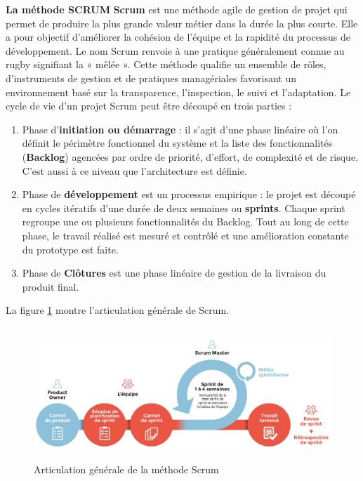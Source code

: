 \textbf{La méthode SCRUM}
\newline
\textbf{Scrum} est une méthode agile de gestion de projet qui permet de produire la plus grande valeur métier dans la durée la plus courte. Elle a pour objectif d’améliorer la cohésion de l’équipe et la rapidité du processus de développement. Le nom Scrum renvoie à une pratique généralement connue au rugby signifiant la « mêlée ». \newline
Cette méthode qualifie un ensemble de rôles, d’instruments de gestion et de pratiques managériales favorisant un environnement basé sur la transparence, l’inspection, le suivi et l’adaptation. Le cycle de vie d’un projet Scrum peut être découpé en trois parties :
\begin{enumerate}
	\item Phase d'\textbf{initiation ou démarrage} : il s’agit d’une phase linéaire où l’on définit le périmètre fonctionnel du système et la liste des fonctionnalités (\textbf{Backlog}) agencées par ordre de priorité, d’effort, de complexité et de risque. C’est aussi à ce niveau que l’architecture est définie.
	
	\item Phase de \textbf{développement} est un processus empirique : le projet est découpé en cycles itératifs d’une durée de deux semaines ou \textbf{sprints}. Chaque sprint regroupe une ou plusieurs fonctionnalités du Backlog. Tout au long de cette phase, le travail réalisé est mesuré et contrôlé et une amélioration constante du prototype est faite.
	
	\item Phase de \textbf{Clôtures} est une phase linéaire de gestion de la livraison du produit final.
\end{enumerate}
La figure \ref{Scrum} montre l’articulation générale de Scrum. \newline
\begin{figure}[h]
	\includegraphics[width=15cm, height=5cm]{./Template LaTeX/Images/scrum1.jpeg}
	\centering
	\caption{Articulation générale de la méthode Scrum}
	\label{Scrum}
\end{figure}
